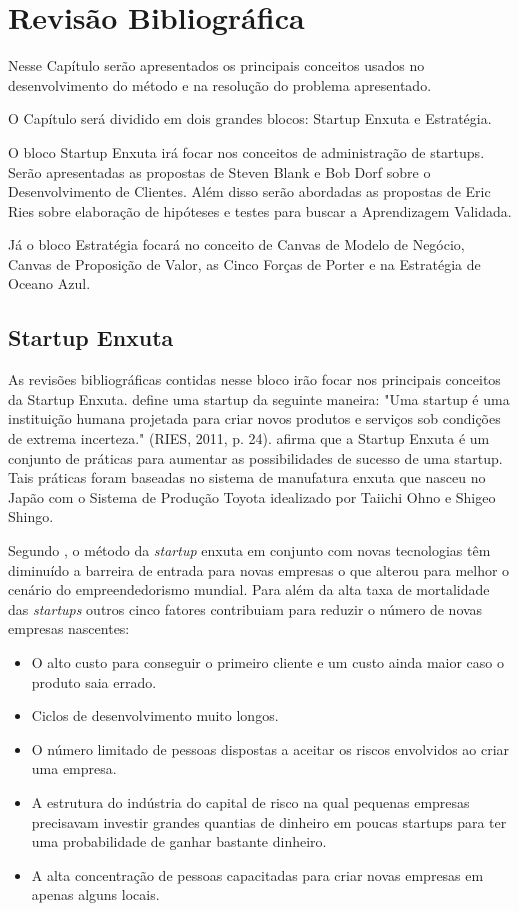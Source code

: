 \chapter[Revisão Bibliográfica]{Revisão Bibliográfica}
\label{chap:revisao}

Nesse Capítulo serão apresentados os principais conceitos usados no desenvolvimento do método e na resolução do problema apresentado.

O Capítulo será dividido em dois grandes blocos: Startup Enxuta e Estratégia.

O bloco Startup Enxuta irá focar nos conceitos de administração de startups. Serão apresentadas as propostas de Steven Blank e Bob Dorf sobre o Desenvolvimento de Clientes. Além disso serão abordadas as propostas de Eric Ries sobre elaboração de hipóteses e testes para buscar a Aprendizagem Validada.

Já o bloco Estratégia focará no conceito de Canvas de Modelo de Negócio, Canvas de Proposição de Valor, as Cinco Forças de Porter e na Estratégia de Oceano Azul.

\section{Startup Enxuta}
\label{cha:startupenxuta}
As revisões bibliográficas contidas nesse bloco irão focar nos principais conceitos da Startup Enxuta.  define uma startup da seguinte maneira: "Uma startup é uma instituição humana projetada para criar novos produtos e serviços sob condições de extrema incerteza." (RIES, 2011, p. 24).  afirma que a Startup Enxuta é um conjunto de práticas para aumentar as possibilidades de sucesso de uma startup. Tais práticas foram baseadas no sistema de manufatura enxuta que nasceu no Japão com o Sistema de Produção Toyota idealizado por Taiichi Ohno e Shigeo Shingo.

Segundo , o método da \textit{startup} enxuta em conjunto com novas tecnologias têm diminuído a barreira de entrada para novas empresas o que alterou para melhor o cenário do empreendedorismo mundial. Para  além da alta taxa de mortalidade das \textit{startups} outros cinco fatores contribuiam para reduzir o número de novas empresas nascentes:
\begin{itemize}
\item O alto custo para conseguir o primeiro cliente e um custo ainda maior caso o produto saia errado.
\item Ciclos de desenvolvimento muito longos.
\item O número limitado de pessoas dispostas a aceitar os riscos envolvidos ao criar uma empresa.
\item A estrutura do indústria do capital de risco na qual pequenas empresas precisavam investir grandes quantias de dinheiro em poucas startups para ter uma probabilidade de ganhar bastante dinheiro.
\item A alta concentração de pessoas capacitadas para criar novas empresas em apenas alguns locais.
\end{itemize} 

